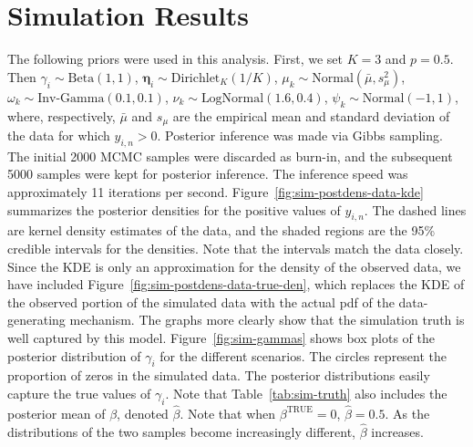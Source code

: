 \documentclass[12pt]{article} %
\newcommand{\Normal}{\text{Normal}}
\newcommand{\Beta}{\text{Beta}}
\newcommand{\InvGamma}{\text{Inv-Gamma}}
\newcommand{\Dirichlet}{\text{Dirichlet}}
\newcommand{\LogNormal}{\text{LogNormal}}
\newcommand{\true}{\text{TRUE}}
\begin{document}
\section{Simulation Results}\label{sec:sim-results}
The following priors were used in this analysis. First, we set $K=3$ and
$p=0.5$. Then $\gamma_i\sim\Beta(1, 1)$, $\bm\eta_i\sim\Dirichlet_K(1/K)$,
$\mu_k\sim\Normal(\bar{\mu}, s_\mu^2)$, $\omega_k\sim\InvGamma(0.1, 0.1)$,
$\nu_k\sim\LogNormal(1.6, 0.4)$, $\psi_k\sim\Normal(-1, 1)$, where,
respectively, $\bar{\mu}$ and $s_\mu$ are the empirical mean
and standard deviation of the data for which $y_{i,n} > 0$. Posterior
inference was made via Gibbs sampling. The initial 2000 MCMC samples were
discarded as burn-in, and the subsequent 5000 samples were kept for
posterior inference.
%
%
The inference speed was approximately 11 iterations per second.
Figure~\ref{fig:sim-postdens-data-kde} summarizes the posterior densities for
the positive values of $y_{i,n}$. The dashed lines are kernel density
estimates of the data, and the shaded regions are the 95\% credible intervals
for the densities. Note that the intervals match the data closely.
%
Since the KDE is only an approximation for the density of the observed data,
we have included Figure~\ref{fig:sim-postdens-data-true-den}, which replaces
the KDE of the observed portion of the simulated data with the actual pdf of
the data-generating mechanism. The graphs more clearly show that the simulation
truth is well captured by this model. 
%
Figure~\ref{fig:sim-gammas} shows box plots of the posterior distribution of
$\gamma_i$ for the different scenarios. The circles represent the proportion
of zeros in the simulated data. The posterior distributions easily capture the
true values of $\gamma_i$.
%
Note that Table~\ref{tab:sim-truth} also includes the posterior mean of
$\beta$, denoted $\hat\beta$. Note that when $\beta^\true=0$,
$\hat\beta=0.5$. As the distributions of the two samples become increasingly
different, $\hat\beta$ increases.
\end{document}
